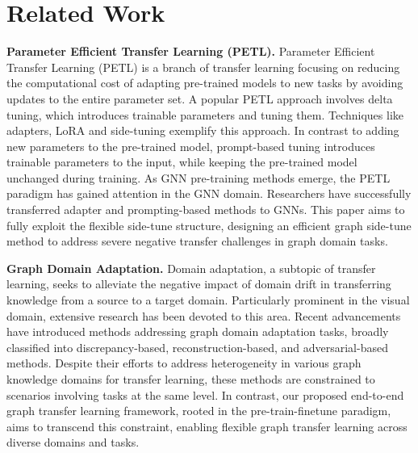 \section{Related Work}
\textbf{Parameter Efficient Transfer Learning (PETL).} Parameter Efficient Transfer Learning (PETL) is a branch of transfer learning focusing on reducing the computational cost of adapting pre-trained models to new tasks by avoiding updates to the entire parameter set.
A popular PETL approach involves delta tuning, which introduces trainable parameters and tuning them. Techniques like adapters\citep{houlsby2019adapter,sung2022vladapter,zhang2021tipadapter}, LoRA\citep{hu2021lora} and side-tuning\citep{zhang2020side,sung2022lst} exemplify this approach. In contrast to adding new parameters to the pre-trained model, prompt-based tuning\citep{lester2021prompt,zhou2022vprompt, li2021prefix, li2023towards, li2024encapsulating} introduces trainable parameters to the input, while keeping the pre-trained model unchanged during training. As GNN pre-training methods\citep{hu2019pretrainstrategies, zhu2021graphcl,xia2022simgrace,Zhu_Xu_Yu_Liu_Wu_Wang_2021,Jin_Derr_Liu_Wang_Wang_Liu_Tang_2020} emerge, the PETL paradigm has gained attention in the GNN domain. Researchers have successfully transferred adapter\citep{li2023adaptergnn} and prompting-based methods\citep{sun2023all, sun2022gppt} to GNNs. This paper aims to fully exploit the flexible side-tune structure, designing an efficient graph side-tune method to address severe negative transfer challenges in graph domain tasks.

\noindent \textbf{Graph Domain Adaptation.} Domain adaptation, a subtopic of transfer learning, seeks to alleviate the negative impact of domain drift in transferring knowledge from a source to a target domain\citep{pan2009transfersurvey}. Particularly prominent in the visual domain, extensive research has been devoted to this area\citep{ganin2016domain,tan2017domaindistant,long2015domainlearning,long2018domainconditional,zhuang2015domainsupervised, pei2018domainmulti}. Recent advancements have introduced methods addressing graph domain adaptation tasks, broadly classified into discrepancy-based\citep{pilanci2020domainalign,vural2019domainadapt}, reconstruction-based\citep{wu2020unsupervised,cai2021graphrecons}, and adversarial-based methods\citep{dai2022graphadv,shen2020adversarial,zhang2019dane}. Despite their efforts to address heterogeneity in various graph knowledge domains for transfer learning, these methods are constrained to scenarios involving tasks at the same level. In contrast, our proposed end-to-end graph transfer learning framework, rooted in the pre-train-finetune paradigm, aims to transcend this constraint, enabling flexible graph transfer learning across diverse domains and tasks.


